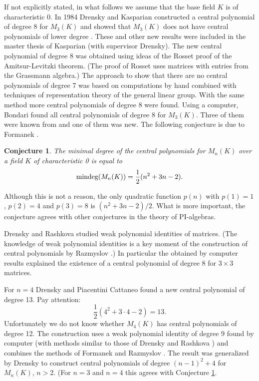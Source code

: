 \documentclass[12pt]{amsart}
\newtheorem{conjecture}[theorem]{Conjecture}
\theoremstyle{definition}
\begin{document}
If not explicitly stated, in what follows we assume that the base field $K$ is of characteristic 0.
In 1984 Drensky and Kasparian constructed a central polynomial of degree 8 for $M_3(K)$ \cite{DrKas2}
and showed that $M_3(K)$ does not have central polynomials of lower degree \cite{DrKas1}.
These and other new results were included in the master thesis of Kasparian \cite{Kas} (with supervisor Drensky).
The new central polynomial of degree 8 was obtained using ideas of the Rosset proof \cite{Ros} of the Amitsur-Levitzki theorem.
(The proof of Rosset uses matrices with entries from the Grassmann algebra.)
The approach to show that there are no central polynomials of degree 7
was based on computations by hand combined with techniques of representation theory of the general linear group.
With the same method more central polynomials of degree 8 were found.
Using a computer, Bondari \cite{Bo} found all central polynomials of degree 8 for $M_3(K)$.
Three of them were known from \cite{DrKas1} and one of them was new.
The following conjecture is due to Formanek \cite{Fo2}.

\begin{conjecture}\label{Conjecture of Formanek}
The minimal degree
of the central polynomials for $M_n(K)$ over a field
$K$ of characteristic 0 is equal to
\[
\text{\rm mindeg}(M_n(K))=\frac{1}{2}(n^2+3n-2).
\]
\end{conjecture}

Although this is not a reason, the only quadratic function $p(n)$ with
$p(1)=1$, $p(2)=4$ and $p(3)=8$ is $(n^2+3n-2)/2$.
What is more important, the conjecture
agrees with other conjectures in the theory of
PI-algebras.

Drensky and Rashkova \cite{DrRa} studied weak polynomial identities of matrices.
(The knowledge of weak polynomial identities is a key moment of the construction of central polynomials by Razmyslov \cite{Raz1}.)
In particular the obtained by computer results explained the existence of a central polynomial of degree 8 for $3\times 3$ matrices.

For $n=4$ Drensky and Piacentini Cattaneo \cite{DrPC} found
a new central polynomial of degree 13. Pay attention:
\[
\frac{1}{2}(4^2+3\cdot 4-2)=13.
\]
Unfortunately we do not know whether $M_4(K)$ has central polynomials of degree 12.
The construction uses a weak polynomial identity of degree 9 found by computer
(with methods similar to those of Drensky and Rashkova \cite{DrRa})
and combines the methods of Formanek \cite{Fo1} and Razmyslov \cite{Raz1}.
The result was generalized by Drensky \cite{Dr2} to construct central
polynomials of degree $(n-1)^2+4$ for $M_n(K)$, $n>2$.
(For $n=3$ and $n=4$ this agrees with Conjecture \ref{Conjecture of Formanek}.
\end{document}
